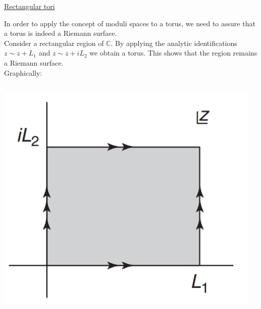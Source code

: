 \documentclass[11pt,aspectratio=169]{beamer}
\begin{document}
\begin{frame}{\underline{Rectangular tori}}

	In order to apply the concept of moduli spaces to a torus, we need to assure that a torus is indeed a Riemann surface.
	\\
	Consider a rectangular region of $\mathbb{C}$. By applying the analytic identifications $z \sim z + L_1$ and $z \sim z + iL_2$
	we obtain a torus. This shows that the region remains a Riemann surface. 
	\\
	Graphically:
	\begin{columns}
		\begin{column}{0.25\textwidth}
			\includegraphics[width=\columnwidth]{elements/region C.PNG}
		\end{column}
		\begin{column}{0.2\textwidth}

\end{column}
\end{columns}
\end{frame}
\end{document}
